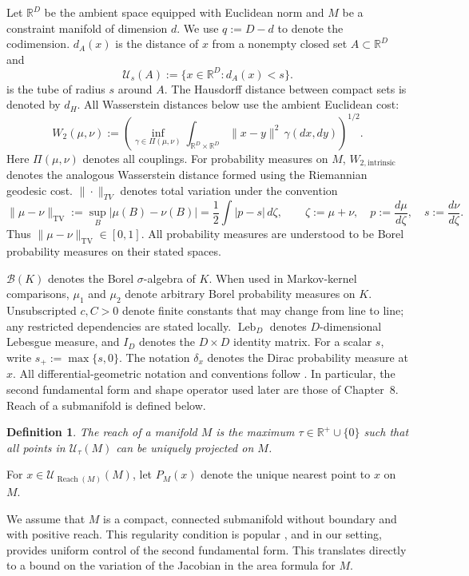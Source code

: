 \documentclass{article}
\newcommand{\R}{\mathbb R}
\newcommand{\Reach}{\operatorname{Reach}}
\newcommand{\TV}{\mathrm{TV}}
\newcommand{\Leb}{\operatorname{Leb}}
\newcommand{\cU}{\mathcal U}
\numberwithin{equation}{section}
\newcommand{\Rbb}{\mathbb{R}}
\newcommand{\Ucal}{\mathcal{U}}
\newtheorem{definition}{Definition}[section]
\begin{document}
Let $\Rbb^D$ be the ambient space equipped with Euclidean norm and $M$ be a constraint manifold of dimension $d$. We use $q:=D-d$ to denote the codimension. $d_A(x)$ is the distance of $x$ from a nonempty closed set $A\subset\R^D$ and
\[
  \cU_s(A):=\{x\in\R^D:d_A(x)<s\}.
\]
is the tube of radius $s$ around $A$.
The Hausdorff distance between compact sets is denoted by $d_H$.  All
Wasserstein distances below use the ambient Euclidean cost:
\[
 W_2(\mu,\nu)
 :=\left(
   \inf_{\gamma\in\Pi(\mu,\nu)}
   \int_{\R^D\times\R^D}\lVert x-y\rVert^2\,\gamma(dx,dy)
 \right)^{1/2}.
\]
Here $\Pi(\mu,\nu)$ denotes all couplings. For probability measures on
$M$, $W_{2,\mathrm{intrinsic}}$ denotes the analogous Wasserstein distance
formed using the Riemannian geodesic cost.
$\|\cdot\|_{TV}$ denotes total variation under the convention
\[
 \lVert\mu-\nu\rVert_{\TV}
 :=\sup_B|\mu(B)-\nu(B)|
 =\frac12\int|p-s|\,d\zeta,
 \qquad
 \zeta:=\mu+\nu,
 \quad p:=\frac{d\mu}{d\zeta},
 \quad s:=\frac{d\nu}{d\zeta}.
\]
Thus $\lVert\mu-\nu\rVert_{\TV}\in[0,1]$. All probability measures are
understood to be Borel probability measures on their stated spaces.


$\mathcal B(K)$ denotes the Borel $\sigma$-algebra of $K$. When used in
Markov-kernel comparisons, $\mu_1$ and $\mu_2$ denote arbitrary Borel
probability measures on $K$. Unsubscripted $c,C>0$ denote finite constants
that may change from line to line; any restricted dependencies are stated
locally.
$\Leb_D$ denotes $D$-dimensional Lebesgue measure, and $I_D$ denotes the
$D\times D$ identity matrix. For a scalar $s$, write
$s_+:=\max\{s,0\}$. The notation $\delta_x$ denotes the Dirac probability measure at $x$.
All differential-geometric notation and conventions follow
\citet{lee2018riemannian}. In particular, the second fundamental form and
shape operator used later are those of Chapter~8. Reach of a submanifold is defined below.
\begin{definition}
  The reach of a manifold $M$ is the maximum $\tau\in \Rbb^+\cup\{0\}$ such that all points in $\Ucal_\tau(M)$ can be uniquely projected on $M$.
\end{definition}
For $x\in\Ucal_{\Reach(M)}(M)$, let $P_M(x)$ denote the unique nearest
point to $x$ on $M$.


We assume that $M$ is a compact, connected submanifold without boundary
and with positive reach. This regularity condition is popular \citep{aamari2017thesis,aamari2019nonasymptotic,aamari2019reach}, and in our setting, provides uniform
control of the second fundamental form. This
translates directly to a bound on the variation of the
Jacobian in the area formula for $M$.
\end{document}
